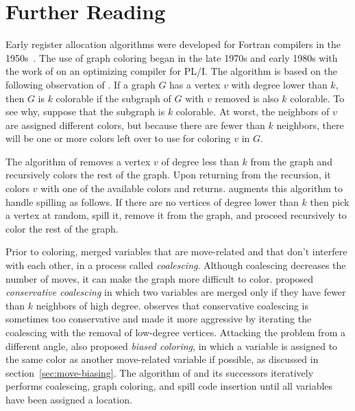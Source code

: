 \documentclass[7x10]{TimesAPriori_MIT}%
\numberwithin{theorem}{chapter}
\numberwithin{definition}{chapter}
\numberwithin{equation}{chapter}
\begin{document}



\section{Further Reading}
\label{sec:register-allocation-further-reading}

Early register allocation algorithms were developed for Fortran
compilers in the 1950s~\citep{Horwitz:1966aa,Backus:1978aa}.  The use
of graph coloring began in the late 1970s and early 1980s with the
work of \citet{Chaitin:1981vl} on an optimizing compiler for PL/I. The
algorithm is based on the following observation of
\citet{Kempe:1879aa}. If a graph $G$ has a vertex $v$ with degree
lower than $k$, then $G$ is $k$ colorable if the subgraph of $G$ with
$v$ removed is also $k$ colorable. To see why, suppose that the
subgraph is $k$ colorable.  At worst, the neighbors of $v$ are assigned
different colors, but because there are fewer than $k$ neighbors, there
will be one or more colors left over to use for coloring $v$ in $G$.

The algorithm of \citet{Chaitin:1981vl} removes a vertex $v$ of degree
less than $k$ from the graph and recursively colors the rest of the
graph. Upon returning from the recursion, it colors $v$ with one of
the available colors and returns.  \citet{Chaitin:1982vn} augments
this algorithm to handle spilling as follows. If there are no vertices
of degree lower than $k$ then pick a vertex at random, spill it,
remove it from the graph, and proceed recursively to color the rest of
the graph.

Prior to coloring, \citet{Chaitin:1981vl} merged variables that are
move-related and that don't interfere with each other, in a process
called \emph{coalescing}. Although coalescing decreases the number of
moves, it can make the graph more difficult to
color. \citet{Briggs:1994kx} proposed \emph{conservative coalescing} in
which two variables are merged only if they have fewer than $k$
neighbors of high degree. \citet{George:1996aa} observes that
conservative coalescing is sometimes too conservative and made it more
aggressive by iterating the coalescing with the removal of low-degree
vertices.
%
Attacking the problem from a different angle, \citet{Briggs:1994kx}
also proposed \emph{biased coloring}, in which a variable is assigned to
the same color as another move-related variable if possible, as
discussed in section~\ref{sec:move-biasing}.
%
The algorithm of \citet{Chaitin:1981vl} and its successors iteratively
performs coalescing, graph coloring, and spill code insertion until
all variables have been assigned a location.
\end{document}
